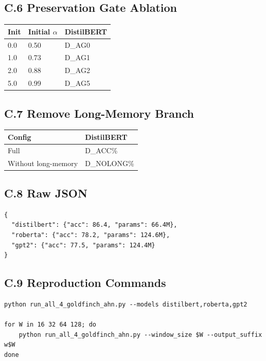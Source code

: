 \subsection{C.6 Preservation Gate Ablation}

\begin{table}[H]
\centering
\small
\begin{tabular}{lll}
\toprule
\textbf{Init} & \textbf{Initial $\alpha$} & \textbf{DistilBERT} \\
\midrule
0.0 & 0.50 & {{D\_AG0}} \\
1.0 & 0.73 & {{D\_AG1}} \\
2.0 & 0.88 & {{D\_AG2}} \\
5.0 & 0.99 & {{D\_AG5}} \\
\bottomrule
\end{tabular}
\end{table}

\subsection{C.7 Remove Long-Memory Branch}

\begin{table}[H]
\centering
\small
\begin{tabular}{ll}
\toprule
\textbf{Config} & \textbf{DistilBERT} \\
\midrule
Full & {{D\_ACC}}\% \\
Without long-memory & {{D\_NOLONG}}\% \\
\bottomrule
\end{tabular}
\end{table}

\subsection{C.8 Raw JSON}

\begin{lstlisting}
{
  "distilbert": {"acc": 86.4, "params": 66.4M},
  "roberta": {"acc": 78.2, "params": 124.6M},
  "gpt2": {"acc": 77.5, "params": 124.4M}
}
\end{lstlisting}

\subsection{C.9 Reproduction Commands}

\begin{lstlisting}
python run_all_4_goldfinch_ahn.py --models distilbert,roberta,gpt2

for W in 16 32 64 128; do
    python run_all_4_goldfinch_ahn.py --window_size $W --output_suffix w$W
done
\end{lstlisting}

